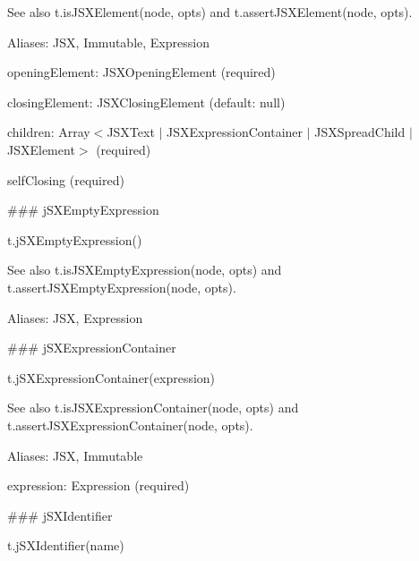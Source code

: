 See also {\ttfamily t.\+is\+J\+S\+X\+Element(node, opts)} and {\ttfamily t.\+assert\+J\+S\+X\+Element(node, opts)}.

Aliases\+: {\ttfamily J\+SX}, {\ttfamily Immutable}, {\ttfamily Expression}


\begin{DoxyItemize}
\item {\ttfamily opening\+Element}\+: {\ttfamily J\+S\+X\+Opening\+Element} (required)
\item {\ttfamily closing\+Element}\+: {\ttfamily J\+S\+X\+Closing\+Element} (default\+: {\ttfamily null})
\item {\ttfamily children}\+: {\ttfamily Array$<$J\+S\+X\+Text $\vert$ J\+S\+X\+Expression\+Container $\vert$ J\+S\+X\+Spread\+Child $\vert$ J\+S\+X\+Element$>$} (required)
\item {\ttfamily self\+Closing} (required) 


\end{DoxyItemize}

\#\#\# j\+S\+X\+Empty\+Expression 
\begin{DoxyCode}
t.jSXEmptyExpression()
\end{DoxyCode}


See also {\ttfamily t.\+is\+J\+S\+X\+Empty\+Expression(node, opts)} and {\ttfamily t.\+assert\+J\+S\+X\+Empty\+Expression(node, opts)}.

Aliases\+: {\ttfamily J\+SX}, {\ttfamily Expression}





\#\#\# j\+S\+X\+Expression\+Container 
\begin{DoxyCode}
t.jSXExpressionContainer(expression)
\end{DoxyCode}


See also {\ttfamily t.\+is\+J\+S\+X\+Expression\+Container(node, opts)} and {\ttfamily t.\+assert\+J\+S\+X\+Expression\+Container(node, opts)}.

Aliases\+: {\ttfamily J\+SX}, {\ttfamily Immutable}


\begin{DoxyItemize}
\item {\ttfamily expression}\+: {\ttfamily Expression} (required) 


\end{DoxyItemize}

\#\#\# j\+S\+X\+Identifier 
\begin{DoxyCode}
t.jSXIdentifier(name)
\end{DoxyCode}


